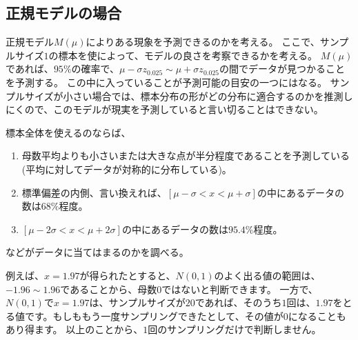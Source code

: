 \subsection{正規モデルの場合}
正規モデル$M(\mu)$によりある現象を予測できるのかを考える。
ここで、サンプルサイズ$1$の標本を使によって、モデルの良さを考察できるかを考える。
$M(\mu)$であれば、$95\%$の確率で、$\mu-\sigma z_{0.025}\sim \mu+\sigma z_{0.025}$の間でデータが見つかることを予測する。
この中に入っていることが予測可能の目安の一つにはなる。
サンプルサイズが小さい場合では、標本分布の形がどの分布に適合するのかを推測しにくので、このモデルが現実を予測していると言い切ることはできない。

標本全体を使えるのならば、
\begin{enumerate}
 \item 母数平均よりも小さいまたは大きな点が半分程度であることを予測している(平均に対してデータが対称的に分布している)。
 \item 標準偏差の内側、言い換えれば、$[\mu-\sigma<x<\mu+\sigma]$の中にあるデータの数は$68\%$程度。
 \item $[\mu-2\sigma < x < \mu+2\sigma]$の中にあるデータの数は$95.4\%$程度。
\end{enumerate}
などがデータに当てはまるのかを調べる。




例えば、$x=1.97$が得られたとすると、$N(0,1)$のよく出る値の範囲は、$-1.96\sim1.96$であることから、母数$0$ではないと判断できます。
一方で、$N(0,1)$で$x=1.97$は、サンプルサイズが$20$であれば、そのうち$1$回は、$1.97$をとる値です。もしももう一度サンプリングできたとして、その値が$0$になることもあり得ます。
以上のことから、$1$回のサンプリングだけで判断しません。
\fi

